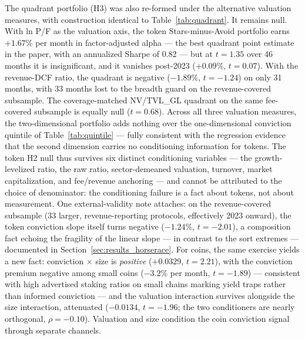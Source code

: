 \documentclass[12pt]{article}
\begin{document}
The quadrant portfolio (H3) was also re-formed under the alternative valuation
measures, with construction identical to Table~\ref{tab:quadrant}. It remains null.
With ln P/F as the valuation axis, the token Stars-minus-Avoid portfolio earns
$+1.67\%$ per month in factor-adjusted alpha --- the best quadrant point estimate in
the paper, with an annualized Sharpe of 0.82 --- but at $t=1.35$ over 46 months it is
insignificant, and it vanishes post-2023 ($+0.09\%$, $t=0.07$). With the revenue-DCF
ratio, the quadrant is negative ($-1.89\%$, $t=-1.24$) on only 31 months, with 33
months lost to the breadth guard on the revenue-covered subsample. The coverage-matched
NV/TVL\_GL quadrant on the same fee-covered subsample is equally null ($t=0.68$).
Across all three valuation measures, the two-dimensional portfolio adds nothing over
the one-dimensional conviction quintile of Table~\ref{tab:quintile} --- fully
consistent with the regression evidence that the second dimension carries no
conditioning information for tokens. The token H2 null thus survives six distinct
conditioning variables --- the growth-levelized ratio, the raw ratio, sector-demeaned
valuation, turnover, market capitalization, and fee/revenue anchoring --- and cannot
be attributed to the choice of denominator: the conditioning failure is a fact about
tokens, not about measurement. One external-validity note attaches: on the
revenue-covered subsample (33 larger, revenue-reporting protocols, effectively
2023 onward), the token conviction slope itself turns negative ($-1.24\%$, $t=-2.01$),
a composition fact echoing the fragility of the linear slope --- in contrast to the
sort extremes --- documented in Section~\ref{sec:results_horserace}. For coins, the same exercise yields a new
fact: conviction $\times$ size is \textit{positive} ($+0.0329$, $t=2.21$), with the
conviction premium negative among small coins ($-3.2\%$ per month, $t=-1.89$) ---
consistent with high advertised staking ratios on small chains marking yield traps
rather than informed conviction --- and the valuation interaction survives alongside
the size interaction, attenuated ($-0.0134$, $t=-1.96$; the two conditioners are
nearly orthogonal, $\rho=-0.10$). Valuation and size condition the coin conviction
signal through separate channels.
\end{document}
